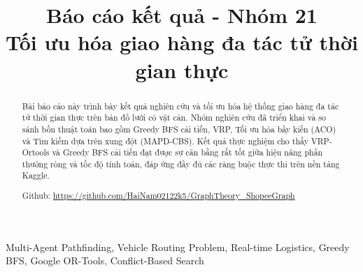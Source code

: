 \documentclass[conference]{IEEEtran}
\begin{document}
\title{Báo cáo kết quả - Nhóm 21 \\ Tối ưu hóa giao hàng đa tác tử thời gian thực
}

\author{
\and
{}
\and
{}
}

\maketitle

\begin{abstract}
Bài báo cáo này trình bày kết quả nghiên cứu và tối ưu hóa hệ thống giao hàng đa tác tử thời gian thực trên bản đồ lưới có vật cản. Nhóm nghiên cứu đã triển khai và so sánh bốn thuật toán bao gồm Greedy BFS cải tiến, VRP, Tối ưu hóa bầy kiến (ACO) và Tìm kiếm dựa trên xung đột (MAPD-CBS). Kết quả thực nghiệm cho thấy VRP-Ortools và Greedy BFS cải tiến đạt được sự cân bằng rất tốt giữa hiệu năng phần thưởng ròng và tốc độ tính toán, đáp ứng đầy đủ các ràng buộc thực thi trên nền tảng Kaggle.

Github: \url{https://github.com/HaiNam02122k5/GraphTheory_ShopeeGraph}

\end{abstract}

\begin{IEEEkeywords}
Multi-Agent Pathfinding, Vehicle Routing Problem, Real-time Logistics, Greedy BFS, Google OR-Tools, Conflict-Based Search
\end{IEEEkeywords}

\end{document}

